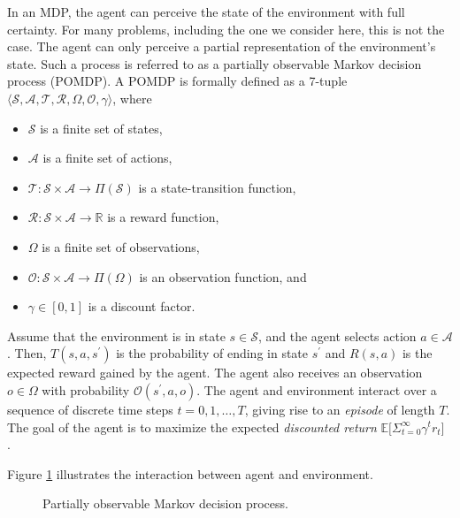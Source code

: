In an MDP, the agent can perceive the state of the environment with full certainty.
For many problems, including the one we consider here, this is not the case.
The agent can only perceive a partial representation of the environment's state.
Such a process is referred to as a partially observable Markov decision process (POMDP).
A POMDP is formally defined as a 7-tuple \(\langle \mathcal{S}, \mathcal{A}, \mathcal{T}, \mathcal{R}, \Omega, \mathcal{O}, \gamma \rangle\), where

\begin{itemize}
    \item \(\mathcal{S}\) is a finite set of states,
    \item \(\mathcal{A}\) is a finite set of actions,
    \item \(\mathcal{T}: \mathcal{S} \times \mathcal{A} \rightarrow \Pi(\mathcal{S})\) is a state-transition function,
    \item \(\mathcal{R}: \mathcal{S} \times \mathcal{A} \rightarrow \mathbb{R}\) is a reward function,
    \item \(\Omega\) is a finite set of observations,
    \item \(\mathcal{O}: \mathcal{S} \times \mathcal{A} \rightarrow \Pi(\Omega)\) is an observation function, and
    \item \(\gamma \in [0, 1]\) is a discount factor.
\end{itemize}

Assume that the environment is in state \(s \in \mathcal{S}\), and the agent selects action \(a \in \mathcal{A}\).
Then, \(T(s, a, s^\prime)\) is the probability of ending in state \(s^\prime\) and \(R(s, a)\) is the expected reward gained by the agent.
The agent also receives an observation \(o \in \Omega\) with probability \(\mathcal{O}(s^\prime, a, o)\).
The agent and environment interact over a sequence of discrete time steps \(t = 0, 1, \dots, T\), giving rise to an \textit{episode} of length \(T\).
The goal of the agent is to maximize the expected \textit{discounted return} \(\mathbb{E} \lbrack \Sigma_{t=0}^\infty \gamma^t r_t \rbrack\).~\cite{kaelbling_pomdp_1998}

Figure \ref{fig:pomdp} illustrates the interaction between agent and environment.

\begin{figure}
    \centering
    
    \label{fig:pomdp}
    \caption[Partially observable Markov decision process]{Partially observable Markov decision process.}
\end{figure}

